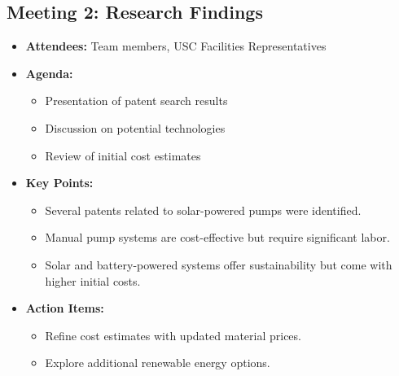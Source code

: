 \documentclass[12pt]{report}
\begin{document}
    \subsection{Meeting 2: Research Findings}
    \begin{itemize}
        \item \textbf{Attendees:} Team members, USC Facilities Representatives
        \item \textbf{Agenda:}
        \begin{itemize}
            \item Presentation of patent search results
            \item Discussion on potential technologies
            \item Review of initial cost estimates
        \end{itemize}
        \item \textbf{Key Points:}
        \begin{itemize}
            \item Several patents related to solar-powered pumps were identified.
            \item Manual pump systems are cost-effective but require significant labor.
            \item Solar and battery-powered systems offer sustainability but come with higher initial costs.
        \end{itemize}
        \item \textbf{Action Items:}
        \begin{itemize}
            \item Refine cost estimates with updated material prices.
            \item Explore additional renewable energy options.
        \end{itemize}
    \end{itemize}
    
    
\end{document}
